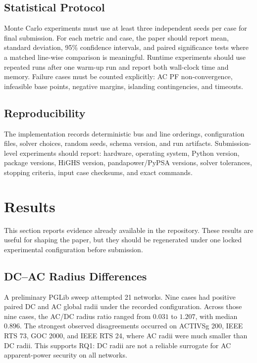 \documentclass[energies,article,submit,pdftex,moreauthors]{Definitions/mdpi}
\begin{document}
\subsection{Statistical Protocol}

Monte Carlo experiments must use at least three independent seeds per case for final submission. For each metric and case, the paper should report mean, standard deviation, 95\% confidence intervals, and paired significance tests where a matched line-wise comparison is meaningful. Runtime experiments should use repeated runs after one warm-up run and report both wall-clock time and memory. Failure cases must be counted explicitly: AC PF non-convergence, infeasible base points, negative margins, islanding contingencies, and timeouts.

\subsection{Reproducibility}

The implementation records deterministic bus and line orderings, configuration files, solver choices, random seeds, schema version, and run artifacts. Submission-level experiments should report: hardware, operating system, Python version, package versions, HiGHS version, pandapower/PyPSA versions, solver tolerances, stopping criteria, input case checksums, and exact commands.

\section{Results}
\label{sec:results}

This section reports evidence already available in the repository. These results are useful for shaping the paper, but they should be regenerated under one locked experimental configuration before submission.

\subsection{DC--AC Radius Differences}

A preliminary PGLib sweep attempted 21 networks. Nine cases had positive paired DC and AC global radii under the recorded configuration. Across those nine cases, the AC/DC radius ratio ranged from $0.031$ to $1.207$, with median $0.896$. The strongest observed disagreements occurred on ACTIVSg 200, IEEE RTS 73, GOC 2000, and IEEE RTS 24, where AC radii were much smaller than DC radii. This supports RQ1: DC radii are not a reliable surrogate for AC apparent-power security on all networks.
\end{document}
